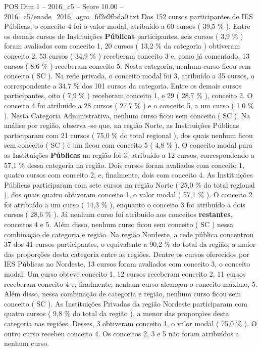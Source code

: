 \begin{textsample}{POS Dim 1 – 2016\_c5 – Score 10.00 – 2016\_c5/enade\_2016\_agro\_6f2e9fbda0.txt}
Dos 152 cursos participantes de IES Públicas, o conceito 4 foi o valor modal, atribuído a 60 cursos ( 39,5 \% ).
Entre os demais cursos de Instituições \textbf{Públicas} participantes, seis cursos ( 3,9 \% ) foram avaliados com conceito 1, 20 cursos ( 13,2 \% da categoria ) obtiveram conceito 2, 53 cursos ( 34,9 \% ) receberam conceito 3 e, como já comentado, 13 cursos ( 8,6 \% ) receberam conceito 5.
Nesta categoria, nenhum curso ficou sem conceito ( SC ).
Na rede privada, o conceito modal foi 3, atribuído a 35 cursos, o correspondente a 34,7 \% dos 101 cursos da categoria.
Entre os demais cursos participantes, oito ( 7,9 \% ) receberam conceito 1, e 29 ( 28,7 \% ), conceito 2.
O conceito 4 foi atribuído a 28 cursos ( 27,7 \% ) e o conceito 5, a um curso ( 1,0 \% ).
Nesta Categoria Administrativa, nenhum curso ficou sem conceito ( SC ).
Na análise por região, observa -se que, na região Norte, as Instituições Públicas participaram com 21 cursos ( 75,0 \% do total regional ), dos quais nenhum ficou sem conceito ( SC ) e um ficou com conceito 5 ( 4,8 \% ).
O conceito modal para as Instituições \textbf{Públicas} na região foi 3, atribuído a 12 cursos, correspondendo a 57,1 \% dessa categoria na região.
Dois cursos foram avaliados com conceito 1, quatro cursos com conceito 2, e, finalmente, dois com conceito 4.
As Instituições Públicas participaram com sete cursos na região Norte ( 25,0 \% do total regional ), dos quais quatro obtiveram conceito 1, o valor modal ( 57,1 \% ).
O conceito 2 foi atribuído a um curso ( 14,3 \% ), enquanto o conceito 3 foi atribuído a dois cursos ( 28,6 \% ).
Já nenhum curso foi atribuído aos conceitos \textbf{restantes}, conceitos 4 e 5.
Além disso, nenhum curso ficou sem conceito ( SC ) nessa combinação de categoria e região.
Na região Nordeste, a rede pública concentrou 37 dos 41 cursos participantes, o equivalente a 90,2 \% do total da região, a maior das proporções desta categoria entre as regiões.
Dentre os cursos oferecidos por IES Públicas no Nordeste, 13 cursos foram avaliados com conceito 3, o conceito modal.
Um curso obteve conceito 1, 12 cursos receberam conceito 2, 11 cursos receberam conceito 4 e, finalmente, nenhum curso alcançou o conceito máximo, 5.
Além disso, nessa combinação de categoria e região, nenhum curso ficou sem conceito ( SC ).
As Instituições Privadas da região Nordeste participaram com quatro cursos ( 9,8 \% do total da região ), a menor das proporções desta categoria nas regiões.
Desses, 3 obtiveram conceito 1, o valor modal ( 75,0 \% ).
O outro curso recebeu conceito 4.
Os conceitos 2, 3 e 5 não foram atribuídos a nenhum curso.

\end{textsample}

